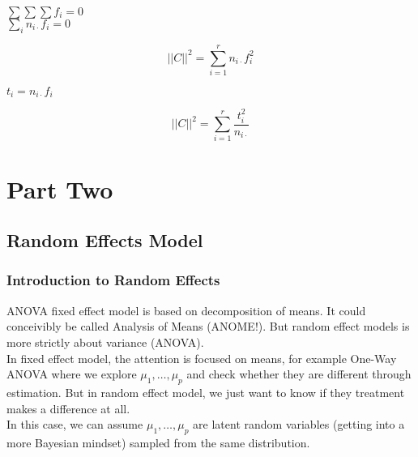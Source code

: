 \documentclass[11pt,fleqn]{book} %
\begin{document}
$\sum \sum \sum f_i = 0$\\

$\sum_i n_{i\cdot} f_i = 0$


			$$||C||^2 = \sum_{i=1}^r n_{i \cdot} f_i^2 $$

$t_i = n_{i \cdot} f_i $

			$$ ||C||^2 = \sum_{i=1}^r \frac{t_i^2}{n_{i \cdot}}$$ 





 \part{Part Two}




\chapter{Random Effects Model}

\section{Introduction to Random Effects}

ANOVA fixed effect model is based on decomposition of means. It could conceivibly be called Analysis of Means (ANOME!). But random effect models is more strictly about variance (ANOVA). \\

In fixed effect model, the attention is focused on means, for example One-Way ANOVA where we explore $\mu_1, \dots, \mu_p$ and check whether they are different through estimation. But in random effect model, we just want to know if they treatment makes a difference at all.\\

In this case, we can assume $\mu_1, \dots, \mu_p$ are latent random variables (getting into a more Bayesian mindset) sampled from the same distribution.  \\
\end{document}
